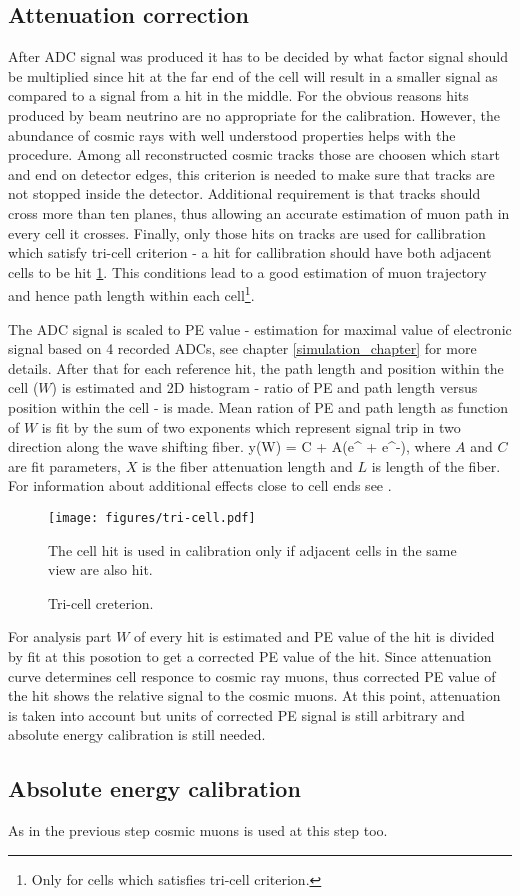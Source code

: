 \subsection{Attenuation correction}
After ADC signal was produced it has to be decided by what factor signal should be multiplied since hit at
the far end of the cell will result in a smaller signal as compared to a signal from a hit in the middle. 
For the obvious reasons hits produced by beam neutrino are no appropriate for the calibration. However,
the abundance of cosmic rays with well understood properties helps with the procedure. Among all reconstructed 
cosmic tracks those are choosen which start and end on detector edges, this criterion is needed to make sure
that tracks are not stopped inside the detector. Additional requirement is that tracks should cross more than
ten planes, thus allowing an accurate estimation of muon path in every cell it crosses. Finally, only those 
hits on tracks are used for callibration which satisfy tri-cell criterion - a hit for callibration should
have both adjacent cells to be hit \ref{fig:tri-cell}. This conditions lead to a good estimation of muon
trajectory and hence path length within each cell\footnote{Only for cells which satisfies tri-cell criterion.}.

The ADC signal is scaled to PE value - estimation for maximal value of electronic signal based on 4 recorded 
ADCs, see chapter \ref{simulation_chapter} for more details. After that for each reference hit, the path length 
and position within the cell ($W$) is estimated and 2D histogram - ratio of PE and path length versus position 
within the cell - is made. Mean ration of PE and path length as function of $W$ is fit by the sum of two exponents
which represent signal trip in two direction along the wave shifting fiber.
\be
y(W) = C + A\Big(e^{} + e^{-}\Big),
\ee
where $A$ and $C$ are fit parameters, $X$ is the fiber attenuation length and $L$ is length of the fiber. For
information about additional effects close to cell ends see \cite{calib_technote}.
\begin{figure}[t]
\texttt{[image: figures/tri-cell.pdf]}
\centering
\caption{Tri-cell creterion.}
{The cell hit is used in calibration only if adjacent cells in the same view are also hit.}
\label{fig:tri-cell}
\end{figure}

For analysis part $W$ of every hit is estimated and PE value of the hit is divided by fit at this posotion to 
get a corrected PE value of the hit. Since attenuation curve determines cell responce to cosmic ray muons, thus 
corrected PE value of the hit shows the relative signal to the cosmic muons. At this point, attenuation is taken
into account but units of corrected PE signal is still arbitrary and absolute energy calibration is still needed. 

\subsection{Absolute energy calibration}
As in the previous step cosmic muons is used at this step too.
